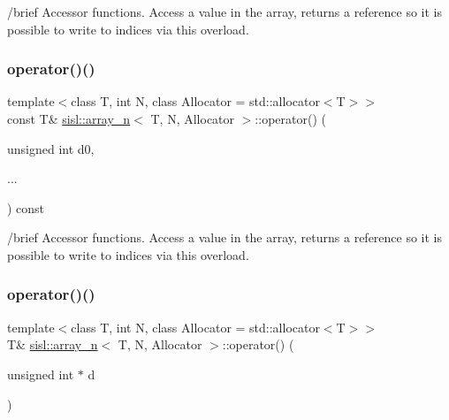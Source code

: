 /brief Accessor functions. Access a value in the array, returns a reference so it is possible to write to indices via this overload. \mbox{\label{classsisl_1_1array__n_a9630d1014796a2dc2a6fe08f94841115}} 
\subsubsection{\texorpdfstring{operator()()}{operator()()}\hspace{0.1cm}{\footnotesize\ttfamily [2/4]}}
{\footnotesize\ttfamily template$<$class T, int N, class Allocator = std\+::allocator$<$\+T$>$$>$ \\
const T\& \hyperlink{classsisl_1_1array__n}{sisl\+::array\+\_\+n}$<$ T, N, Allocator $>$\+::operator() (\begin{DoxyParamCaption}\item[{unsigned int}]{d0,  }\item[{}]{... }\end{DoxyParamCaption}) const\hspace{0.3cm}{\ttfamily [inline]}}

/brief Accessor functions. Access a value in the array, returns a reference so it is possible to write to indices via this overload. \mbox{\label{classsisl_1_1array__n_a33e63f670871d57e28133b212b94a0fc}} 
\subsubsection{\texorpdfstring{operator()()}{operator()()}\hspace{0.1cm}{\footnotesize\ttfamily [3/4]}}
{\footnotesize\ttfamily template$<$class T, int N, class Allocator = std\+::allocator$<$\+T$>$$>$ \\
T\& \hyperlink{classsisl_1_1array__n}{sisl\+::array\+\_\+n}$<$ T, N, Allocator $>$\+::operator() (\begin{DoxyParamCaption}\item[{unsigned int $\ast$}]{d }\end{DoxyParamCaption})\hspace{0.3cm}{\ttfamily [inline]}}

